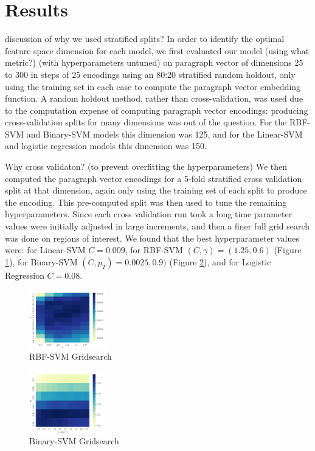 \documentclass[11pt]{article}
\newcommand{\drafting}[1]{\textcolor{OliveGreen}{#1}}
\begin{document}
\section{Results}
\drafting{discussion of why we used stratified splits?}
In order to identify the optimal feature space dimension for each model, we first evaluated our model \drafting{(using what metric?)} (with hyperparameters untuned) on paragraph vector of dimensions 25 to 300 in steps of 25 encodings using an 80:20 stratified random holdout, only using the training set in each case to compute the paragraph vector embedding function. A random holdout method, rather than cross-validation, was used due to the computation expense of computing paragraph vector encodings: producing cross-validation splits for many dimensions was out of the question. For the RBF-SVM and Binary-SVM models this dimension was 125, and for the Linear-SVM and logistic regression models this dimension was 150. 

\drafting{Why cross validaton? (to prevent overfitting the hyperparameters)}
We then computed the paragraph vector encodings for a 5-fold stratified cross validation split at that dimension, again only using the training set of each split to produce the encoding. This pre-computed split was then used to tune the remaining hyperparameters. Since each cross validation run \drafting{took a long time} parameter values were initially adjusted in large increments, and then a finer full grid search was done on regions of interest. We found that the best hyperparameter values were: for Linear-SVM $C = 0.009$, for RBF-SVM $(C, \gamma) = (1.25, 0.6)$ (Figure \ref{fig:rbf-gridsearch}), for Binary-SVM $(C, p_T) = 0.0025, 0.9)$ (Figure \ref{fig:binary-gridsearch}), and for Logistic Regression $C = 0.08$. 
\begin{figure}
	\centering
	\includegraphics[width = 0.3\textwidth]{fig-rbf-gridsearch.png}
	\caption{RBF-SVM Gridsearch}
	\label{fig:rbf-gridsearch}
\end{figure}

\begin{figure}
	\centering
	\includegraphics[width = 0.3\textwidth]{fig-binary-gridsearch.png}
	\caption{Binary-SVM Gridsearch}
	\label{fig:binary-gridsearch}
\end{figure}
\end{document}
